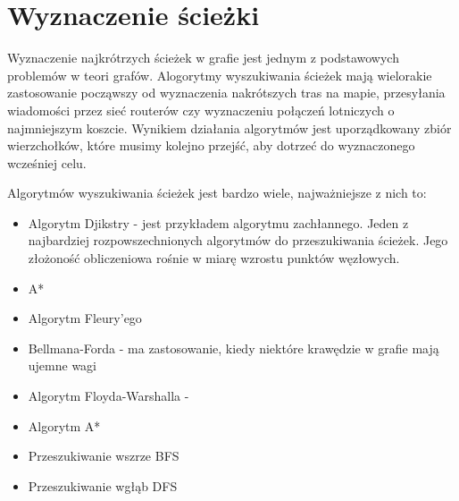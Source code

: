 \chapter{Wyznaczenie ścieżki}

Wyznaczenie najkrótrzych ścieżek w grafie jest jednym z podstawowych problemów w teori grafów. Alogorytmy wyszukiwania ścieżek mają wielorakie zastosowanie począwszy od wyznaczenia nakrótszych tras na mapie, przesyłania wiadomości przez sieć routerów czy wyznaczeniu połączeń lotniczych o najmniejszym koszcie. Wynikiem działania algorytmów jest uporządkowany zbiór wierzchołków, które musimy kolejno przejść, aby dotrzeć do wyznaczonego wcześniej celu.

Algorytmów wyszukiwania ścieżek jest bardzo wiele, najważniejsze z nich to:

\begin{itemize}
\item Algorytm Djikstry - jest przykładem algorytmu zachłannego. Jeden z najbardziej rozpowszechnionych algorytmów do przeszukiwania ścieżek. Jego złożoność obliczeniowa rośnie w miarę wzrostu punktów węzłowych.
\item A*
\item Algorytm Fleury'ego
\item Bellmana-Forda - ma zastosowanie, kiedy niektóre krawędzie w grafie mają ujemne wagi
\item Algorytm Floyda-Warshalla - 
\item Algorytm A*
\item Przeszukiwanie wszrze BFS
\item Przeszukiwanie wgłąb DFS
\end{itemize}